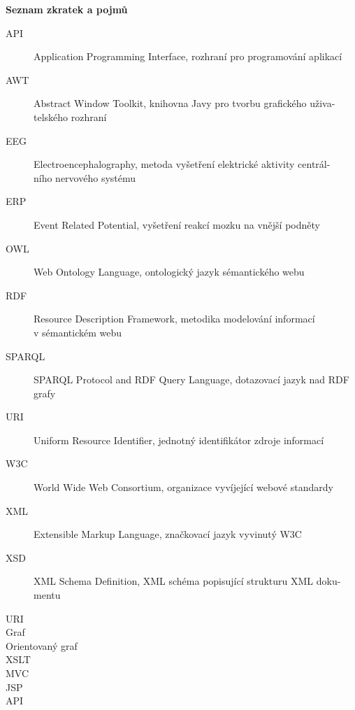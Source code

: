\documentclass{projekt}
\begin{document}
\newpage
\thispagestyle{plain}
\noindent
{\bf \LARGE Seznam zkratek a pojmů}\\

\noindent
\begin{description}
\item[API] Application Programming Interface, rozhraní pro programování aplikací
\item[AWT] Abstract Window Toolkit, knihovna Javy pro tvorbu grafického uživa-\\telského rozhraní
\item[EEG] Electroencephalography, metoda vyšetření elektrické aktivity centrál-\\ního nervového
systému
\item[ERP] Event Related Potential, vyšetření reakcí mozku na vnější podněty
\item[OWL] Web Ontology Language, ontologický jazyk sémantického webu
\item[RDF] Resource Description Framework, metodika modelování informací \\v sémantickém webu
\item[SPARQL] SPARQL Protocol and RDF Query Language, dotazovací jazyk nad RDF grafy
\item[URI] Uniform Resource Identifier, jednotný identifikátor zdroje informací
\item[W3C] World Wide Web Consortium, organizace vyvíjející webové standardy
\item[XML] Extensible Markup Language, značkovací jazyk vyvinutý W3C
\item[XSD] XML Schema Definition, XML schéma popisující strukturu XML doku-\\mentu

\item[URI]
\item[Graf]
\item[Orientovaný graf]
\item[XSLT]
\item[MVC]
\item[JSP]
\item[API]


\end{description}


\listoffigures





\appendix
\newpage


\thispagestyle{plain}
\end{document}
